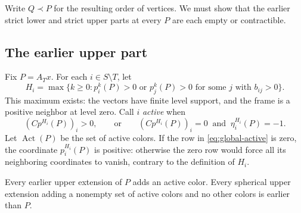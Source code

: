 Write $Q\prec P$ for the resulting order of vertices.  We must show that
the earlier strict lower and strict upper parts at every $P$ are each
empty or contractible.

\subsection{The earlier upper part}

Fix $P=A_Tx$.  For each $i\in S\setminus T$, let
\begin{equation}\label{eq:global-incidence-level}
 H_i=\max\{k\ge0:
       p_i^k(P)>0\text{ or }p_j^k(P)>0
       \text{ for some }j\text{ with }b_{ij}>0\}.
\end{equation}
This maximum exists: the vectors have finite level support, and the frame
is a positive neighbor at level zero.  Call $i$ \emph{active} when
\begin{equation}\label{eq:global-active}
 (Cp^{H_i}(P))_i>0,
 \qquad\text{or}\qquad
 (Cp^{H_i}(P))_i=0\ \text{ and }\ \eta_i^{H_i}(P)=-1.
\end{equation}
Let $\operatorname{Act}(P)$ be the set of active colors.  If the row in
\eqref{eq:global-active} is zero, the coordinate $p_i^{H_i}(P)$ is
positive: otherwise the zero row would force all its neighboring
coordinates to vanish, contrary to the definition of $H_i$.

\begin{lemma}\label{lem:global-upper-comparison}
Every earlier upper extension of $P$ adds an active color.  Every
spherical upper extension adding a nonempty set of active colors and no
other colors is earlier than $P$.
\end{lemma}

